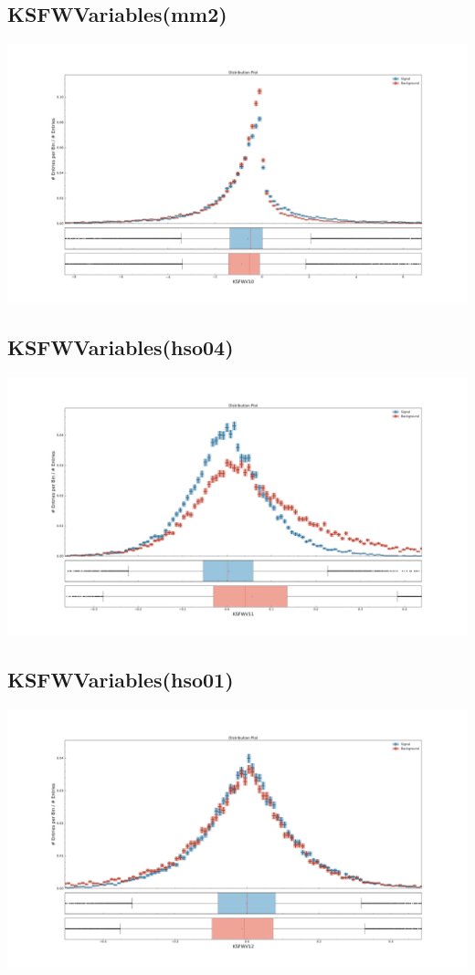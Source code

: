\documentclass[10pt,a4paper]{article}
\begin{document}
\subsection{KSFWVariables(mm2)}
\begin{center}
\includegraphics[width=1.0\textwidth]{variable_7013812909132638654.pdf}
\end{center}
\subsection{KSFWVariables(hso04)}
\begin{center}
\includegraphics[width=1.0\textwidth]{variable_-6351523910911080380.pdf}
\end{center}
\subsection{KSFWVariables(hso01)}
\begin{center}
\includegraphics[width=1.0\textwidth]{variable_9133771725789605.pdf}
\end{center}
\end{document}
